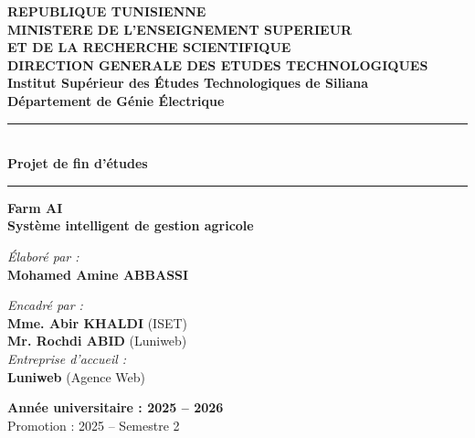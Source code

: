 \documentclass[12pt,a4paper]{report}
\numberwithin{figure}{chapter}
\numberwithin{table}{chapter}
\begin{document}
\thispagestyle{empty}

\begin{titlepage}
  \begin{center}

    {\large \textbf{REPUBLIQUE TUNISIENNE}} \\[2pt]
    {\normalsize \textbf{MINISTERE DE L'ENSEIGNEMENT SUPERIEUR}} \\
    {\normalsize \textbf{ET DE LA RECHERCHE SCIENTIFIQUE}} \\[2pt]
    {\normalsize \textbf{DIRECTION GENERALE DES ETUDES TECHNOLOGIQUES}} \\[0.8cm]

    {\Large \textbf{Institut Supérieur des Études Technologiques de Siliana}} \\[4pt]
    {\large \textbf{Département de Génie Électrique}}

    \vspace{1.5cm}
    \rule{\linewidth}{0.8pt}\\[0.4cm]
    {\Large \textbf{Projet de fin d'études}}\\[0.4cm]
    \rule{\linewidth}{0.8pt}

    \vspace{1cm}

    {\LARGE \textbf{Farm AI}}\\[0.3cm]
    {\LARGE \textbf{Système intelligent de gestion agricole}}

    \vspace{2cm}

    \begin{minipage}{0.45\textwidth}
      \begin{flushleft}
        \emph{Élaboré par :}\\[6pt]
        \textbf{Mohamed Amine ABBASSI}
      \end{flushleft}
    \end{minipage}
    \hfill
    \begin{minipage}{0.45\textwidth}
      \begin{flushright}
        \emph{Encadré par :}\\[4pt]
        \textbf{Mme. Abir KHALDI} (ISET)\\
        \textbf{Mr. Rochdi ABID} (Luniweb)\\[8pt]
        \emph{Entreprise d'accueil :}\\[4pt]
        \textbf{Luniweb} (Agence Web)
      \end{flushright}
    \end{minipage}

    \vfill

    {\large \textbf{Année universitaire : 2025 -- 2026}}\\[4pt]
    {\normalsize Promotion : 2025 -- Semestre 2}

  \end{center}
\end{titlepage}
\end{document}
